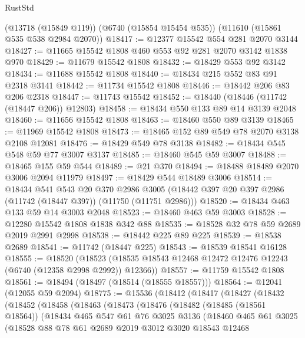 \begin{lexlean}{RustStd}
\begin{coremodule}
    (@13718 (@15849 @119))
    (@6740 (@15854 @15454 @535))
    (@11610 (@15861 @535 @538 @2984 @2070))
@18417 := @12377 @15542 @554 @281 @2070 @3144
@18427 := @11665 @15542 @1808 @460 @553 @92 @281 @2070 @3142 @1838 @970
@18429 := @11679 @15542 @1808
@18432 := @18429 @553 @92 @3142
@18434 := @11688 @15542 @1808
@18440 := @18434 @215 @552 @83 @91 @2318 @3141
@18442 := @11734 @15542 @1808
@18446 := @18442 @206 @83 @206 @2318
@18447 := @11743 @15542
@18452 := @18440 (@18446 (@11742 (@18447 @206)) @12803)
@18458 := @18434 @550 @133 @89 @14 @3139 @2048
@18460 := @11656 @15542 @1808
@18463 := @18460 @550 @89 @3139
@18465 := @11969 @15542 @1808
@18473 := @18465 @152 @89 @549 @78 @2070 @3138 @2108 @12081
@18476 := @18429 @549 @78 @3138
@18482 := @18434 @545 @548 @59 @77 @3007 @3137
@18485 := @18460 @545 @59 @3007
@18488 := @18465 @155 @59 @544
@18489 := @21 @370
@18494 := @18488 @18489 @2070 @3006 @2094 @11979
@18497 := @18429 @544 @18489 @3006
@18514 := @18434
    @541
    @543
    @20
    @370
    @2986
    @3005
    (@18442 @397 @20 @397 @2986 (@11742 (@18447 @397)) (@11750 (@11751 @2986)))
@18520 := @18434 @463 @133 @59 @14 @3003 @2048
@18523 := @18460 @463 @59 @3003
@18528 := @12280 @15542 @1808 @1838 @342 @88
@18535 := @18528 @32 @78 @59 @2689 @2019 @2991 @2998
@18538 := @18442 @225 @89 @225
@18539 := @18538 @2689
@18541 := @11742 (@18447 @225)
@18543 := @18539 @18541 @16128
@18555 := @18520
    (@18523 (@18535 @18543 @12468 @12472 @12476 @12243 (@6740 (@12358 @2998 @2992)) @12366))
@18557 := @11759 @15542 @1808
@18561 := @18494 (@18497 (@18514 (@18555 @18557)))
@18564 := @12041 (@12055 @59 @2094)
@18775 := @15536
    (@18412
      (@18417
        (@18427
          (@18432
            (@18452
              (@18458
                (@18463
                  (@18473
                    (@18476
                      (@18482
                        (@18485 (@18561 @18564))
                        (@18434
                          @465
                          @547
                          @61
                          @76
                          @3025
                          @3136
                          (@18460
                            @465
                            @61
                            @3025
                            (@18528
                              @88
                              @78
                              @61
                              @2689
                              @2019
                              @3012
                              @3020
                              @18543
                              @12468

\end{coremodule}
\end{lexlean}
